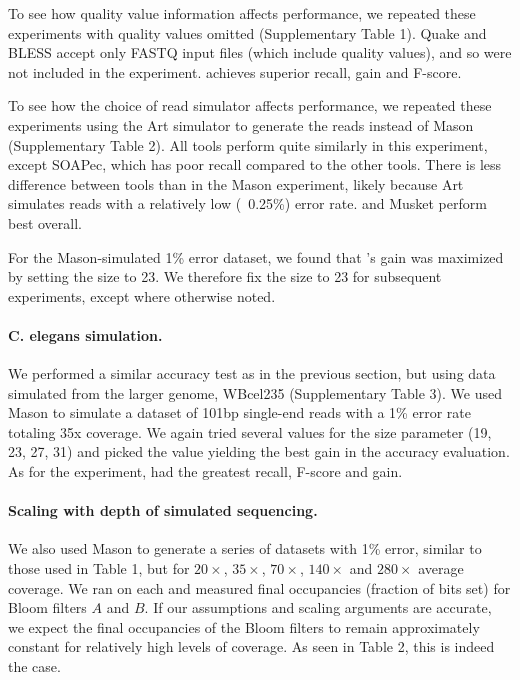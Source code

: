 \documentclass{bmcart}
\begin{document}
To see how quality value information affects performance, we repeated these experiments with quality values omitted (Supplementary Table 1).
Quake and BLESS accept only FASTQ input files (which include quality values), and so were not included in the experiment.
\tool achieves superior recall, gain and F-score.

To see how the choice of read simulator affects performance, we repeated these experiments using the Art \cite{huang2012art} simulator to generate the reads instead of Mason (Supplementary Table 2).
All tools perform quite similarly in this experiment, except SOAPec, which has poor recall compared to the other tools.
There is less difference between tools than in the Mason experiment, likely because Art simulates reads with a relatively low (~0.25\%) error rate.
\tool and Musket perform best overall.

For the Mason-simulated 1\% error dataset, we found that \tool's gain was maximized by setting the \kmer size to 23.  We therefore fix the \kmer size to 23 for subsequent experiments, except where otherwise noted.

\paragraph{C. elegans simulation.}
We performed a similar accuracy test as in the previous section, but using data simulated from the larger \elegans genome, WBcel235 (Supplementary Table 3).  We used Mason to simulate a dataset of 101bp single-end reads with a 1\% error rate totaling 35x coverage.  We again tried several values for the \kmer size parameter (19, 23, 27, 31) and picked the value yielding the best gain in the accuracy evaluation.  As for the \ecoli experiment, \tool had the greatest recall, F-score and gain.

\paragraph{Scaling with depth of simulated sequencing.} We also used Mason to generate a series of datasets with 1\% error, similar to those used in Table 1, but for $20\times$, $35\times$, $70\times$, $140\times$ and $280\times$ average coverage.  We ran \tool on each and measured final occupancies (fraction of bits set) for Bloom filters $A$ and $B$.  If our assumptions and scaling arguments are accurate, we expect the final occupancies of the Bloom filters to remain approximately constant for relatively high levels of coverage.  As seen in Table 2, this is indeed the case.  
\end{document}
